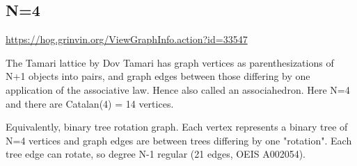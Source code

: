 \documentclass{article}
\begin{document}
\begin{center}
\end{center}

\subsection{N=4}

\url{https://hog.grinvin.org/ViewGraphInfo.action?id=33547}

The Tamari lattice by Dov Tamari has graph vertices as
parenthesizations of N+1 objects into pairs, and graph edges between
those differing by one application of the associative law.  Hence also
called an associahedron.  Here N=4 and there are Catalan(4) = 14
vertices.

Equivalently, binary tree rotation graph.  Each vertex represents a
binary tree of N=4 vertices and graph edges are between trees
differing by one "rotation".  Each tree edge can rotate, so degree N-1
regular (21 edges, OEIS A002054).
\end{document}
